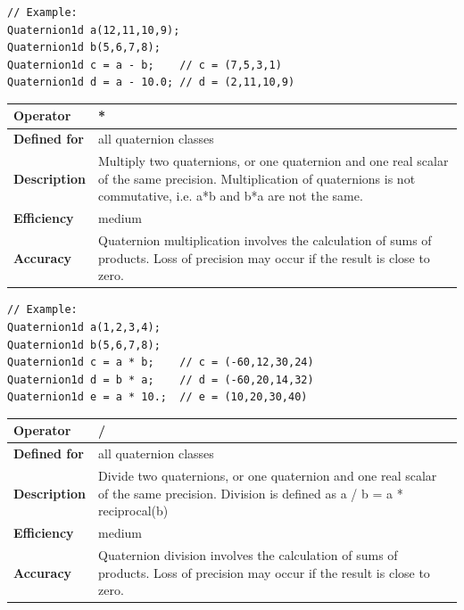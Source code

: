 \documentclass[11pt,a4paper,oneside,openright]{report}
\newcommand{\vspacesmall}{\vspace{3mm}}
\newcommand{\vspacebig}{\vspace{6mm}}
\begin{document}
\begin{lstlisting}[frame=none]
// Example:
Quaternion1d a(12,11,10,9);
Quaternion1d b(5,6,7,8);
Quaternion1d c = a - b;    // c = (7,5,3,1)
Quaternion1d d = a - 10.0; // d = (2,11,10,9)
\end{lstlisting}
\vspacebig


\begin{tabular}{|p{25mm}|p{100mm}|}
\hline
\bfseries Operator & * \\ \hline
\bfseries Defined for & all quaternion classes  \\ \hline
\bfseries Description & Multiply two quaternions, or one quaternion and one real scalar of the same precision. \newline 
Multiplication of quaternions is not commutative, i.e. a*b and b*a are not the same.
\\ \hline
\bfseries Efficiency & medium \\ \hline
\bfseries Accuracy & Quaternion multiplication involves the calculation of sums of products. Loss of precision may occur if the result is close to zero. \\ \hline
\end{tabular}
\vspacesmall

\begin{lstlisting}[frame=none]
// Example:
Quaternion1d a(1,2,3,4);
Quaternion1d b(5,6,7,8);
Quaternion1d c = a * b;    // c = (-60,12,30,24)
Quaternion1d d = b * a;    // d = (-60,20,14,32)
Quaternion1d e = a * 10.;  // e = (10,20,30,40)

\end{lstlisting}
\vspacebig


\begin{tabular}{|p{25mm}|p{100mm}|}
\hline
\bfseries Operator & / \\ \hline
\bfseries Defined for & all quaternion classes  \\ \hline
\bfseries Description & Divide two quaternions, or one quaternion and one real scalar of the same precision. \newline
Division is defined as a / b = a * reciprocal(b) \\ \hline
\bfseries Efficiency & medium \\ \hline
\bfseries Accuracy & Quaternion division involves the calculation of sums of products. Loss of precision may occur if the result is close to zero. \\ \hline
\end{tabular}
\vspacesmall
\end{document}
